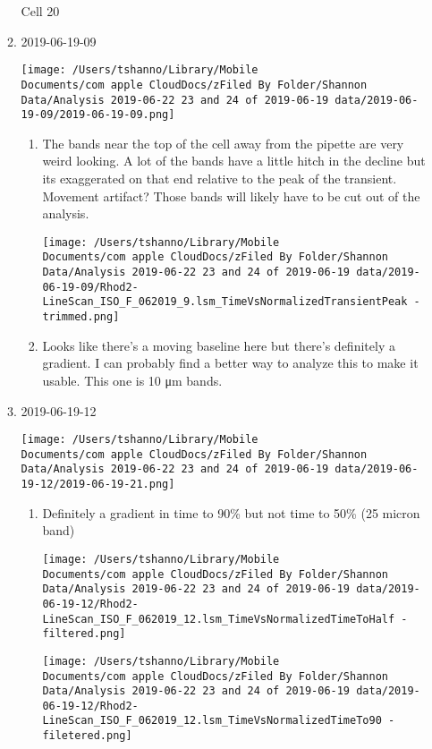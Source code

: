 \documentclass[11pt]{article}
\begin{document}
\begin{enumerate}
\begin{enumerate}
Cell 20
\item 2019-06-19-09
\label{sec:orgfed178c}
\begin{center}
\texttt{[image: /Users/tshanno/Library/Mobile Documents/com~apple~CloudDocs/zFiled By Folder/Shannon Data/Analysis 2019-06-22 23 and 24 of 2019-06-19 data/2019-06-19-09/2019-06-19-09.png]}
\end{center}
\begin{enumerate}
\item The bands near the top of the cell away from the pipette are very weird looking.  A lot of the bands have a little hitch in the decline but its exaggerated on that end relative to the peak of the transient.  Movement artifact?  Those bands will likely have to be cut out of the analysis.
\label{sec:org51c7be1}
\begin{center}
\texttt{[image: /Users/tshanno/Library/Mobile Documents/com~apple~CloudDocs/zFiled By Folder/Shannon Data/Analysis 2019-06-22 23 and 24 of 2019-06-19 data/2019-06-19-09/Rhod2-LineScan\_ISO\_F\_062019\_9.lsm\_TimeVsNormalizedTransientPeak - trimmed.png]}
\end{center}
\item Looks like there's a moving baseline here but there's definitely a gradient.  I can probably find a better way to analyze this to make it usable.  This one is 10 μm bands.
\label{sec:orgdc0c686}
\end{enumerate}
\item 2019-06-19-12
\label{sec:orgded09a6}
\begin{center}
\texttt{[image: /Users/tshanno/Library/Mobile Documents/com~apple~CloudDocs/zFiled By Folder/Shannon Data/Analysis 2019-06-22 23 and 24 of 2019-06-19 data/2019-06-19-12/2019-06-19-21.png]}
\end{center}
\begin{enumerate}
\item Definitely a gradient in time to 90\% but not time to 50\% (25 micron band)
\label{sec:org5ff1d53}
\begin{center}
\texttt{[image: /Users/tshanno/Library/Mobile Documents/com~apple~CloudDocs/zFiled By Folder/Shannon Data/Analysis 2019-06-22 23 and 24 of 2019-06-19 data/2019-06-19-12/Rhod2-LineScan\_ISO\_F\_062019\_12.lsm\_TimeVsNormalizedTimeToHalf - filtered.png]}
\end{center}
\begin{center}
\texttt{[image: /Users/tshanno/Library/Mobile Documents/com~apple~CloudDocs/zFiled By Folder/Shannon Data/Analysis 2019-06-22 23 and 24 of 2019-06-19 data/2019-06-19-12/Rhod2-LineScan\_ISO\_F\_062019\_12.lsm\_TimeVsNormalizedTimeTo90 - filetered.png]}

\end{center}
\end{enumerate}
\end{enumerate}
\end{enumerate}
\end{document}
